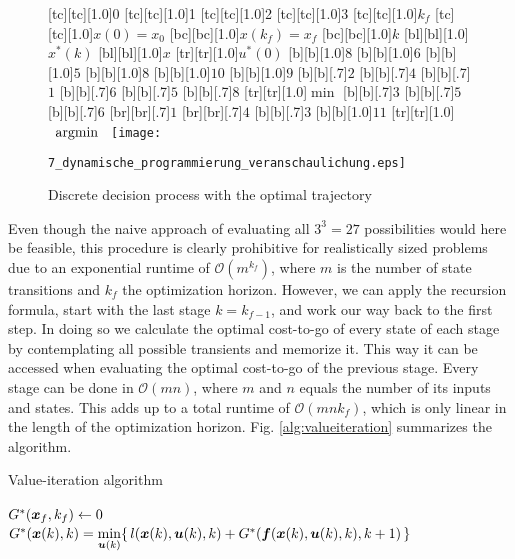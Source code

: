 \begin{figure}[h]
	[tc][tc][1.0]{0}
	[tc][tc][1.0]{1}
	[tc][tc][1.0]{2}
	[tc][tc][1.0]{3}
	[tc][tc][1.0]{$k_f$}
	[tc][tc][1.0]{$x(0) = x_0$}
	[bc][bc][1.0]{$x(k_f) = x_f$}
	[bc][bc][1.0]{$k$}
	[bl][bl][1.0]{$x^\ast(k)$}
	[bl][bl][1.0]{$x$}
	[tr][tr][1.0]{$u^\ast(0)$}
	[b][1.0]{$8$}
	[b][1.0]{$6$}
	[b][1.0]{$5$}
	[b][1.0]{$8$}
	[b][1.0]{$10$}
	[b][1.0]{$9$}
	[b][.7]{$2$}
	[b][.7]{$4$}
	[b][.7]{$1$}
	[b][.7]{$6$}
	[b][.7]{$5$}
	[b][.7]{$8$}
	[tr][tr][1.0]{$\min$}
	[b][.7]{$3$}
	[b][.7]{$5$}
	[b][.7]{$6$}
	[br][br][.7]{$1$}
	[br][br][.7]{$4$}
	[b][.7]{$3$}
	[b][1.0]{$11$}
	[tr][tr][1.0]{$\argmin{}$}
	\centering
  	\texttt{[image: 7\_dynamische\_programmierung\_veranschaulichung.eps]}
	\caption[Discrete decision process]{Discrete decision process with the optimal trajectory}
	\label{fig:dynamische_programmierung_veranschaulichung}
\end{figure} 
Even though the naive approach of evaluating all $3^3 = 27$ possibilities would here be feasible, this procedure is clearly prohibitive for realistically sized problems due to an exponential runtime of $\mathcal O(m^{k_f})$, where $m$ is the number of state transitions and $k_f$ the optimization horizon. 
However, we can apply the recursion formula, start with the last stage $k=k_{f-1}$, and work our way back to the first step. 
In doing so we calculate the optimal cost-to-go of every state of each stage by contemplating all possible transients and memorize it. 
This way it can be accessed when evaluating the optimal cost-to-go of the previous stage. Every stage can be done in $\mathcal O(m n)$, where $m$ and $n$ equals the number of its inputs and states. 
This adds up to a total runtime of $\mathcal O(m n k_f)$, which is only linear in the length of the optimization horizon. Fig. \ref{alg:valueiteration} summarizes the algorithm.
%
%
\begin{algorithm}
  \caption[Value Iteration]{Value-iteration algorithm}

 \begin{algorithmic}[1]

	\STATE $G^\ast(\boldsymbol{x}_f,k_f) \leftarrow 0$
			\STATE $G^\ast(\boldsymbol{x}(k),k) = \underset{\boldsymbol{u}(k)}{\min}\{\,l(\boldsymbol{x}(k), \boldsymbol{u}(k), k) + G^\ast(\boldsymbol{f}(\boldsymbol{x}(k), \boldsymbol{u}(k), k),k+1)\,\}$
		\ENDFOR
	\ENDFOR
 \label{alg:valueiteration}

 \end{algorithmic}
 \end{algorithm}
